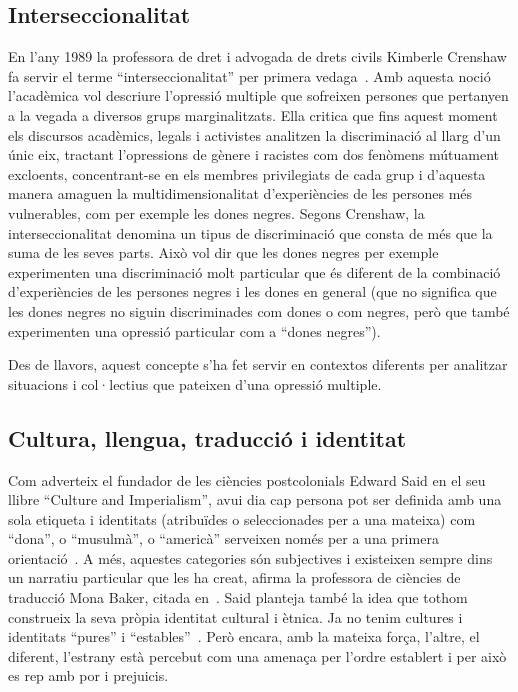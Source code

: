 \subsection{Interseccionalitat}
En l'any 1989 la professora de dret i advogada de drets civils Kimberle Crenshaw fa servir el terme ``interseccionalitat'' per primera vedaga~\autocite{Crenshaw1989}.
Amb aquesta noció l'acadèmica vol descriure l'opressió multiple que sofreixen persones que pertanyen a la vegada a diversos grups marginalitzats.
Ella critica que fins aquest moment els discursos acadèmics, legals i activistes analitzen la discriminació al llarg d'un únic eix,
tractant l'opressions de gènere i racistes com dos fenòmens mútuament excloents,
concentrant-se en els membres privilegiats de cada grup i d'aquesta manera amaguen la multidimensionalitat d'experiències de les persones més vulnerables, com per exemple les dones negres.
Segons Crenshaw, la interseccionalitat denomina un tipus de discriminació que consta de més que la suma de les seves parts.
Això vol dir que les dones negres per exemple experimenten una discriminació molt particular que és diferent de la combinació d'experiències de les persones negres i les dones en general (que no significa que les dones negres no siguin discriminades com dones o com negres, però que també experimenten una opressió particular com a ``dones negres'').

Des de llavors, aquest concepte s'ha fet servir en contextos diferents per analitzar situacions i col·lectius que pateixen d'una opressió multiple.

\subsection{Cultura, llengua, traducció i identitat}
Com adverteix el fundador de les ciències postcolonials Edward Said en el seu llibre ``Culture and Imperialism'', avui dia cap persona pot ser definida amb una sola etiqueta
i identitats (atribuïdes o seleccionades per a una mateixa) com ``dona'', o ``musulmà'', o ``americà'' serveixen només per a una primera orientació~\autocite{Vidal2012}.
A més, aquestes categories són subjectives i existeixen sempre dins un narratiu particular que les ha creat, afirma la professora de ciències de traducció Mona Baker, citada en~\autocite{Vidal2012}.
Said planteja també la idea que tothom construeix la seva pròpia identitat cultural i ètnica.
Ja no tenim cultures i identitats ``pures'' i ``estables''~\autocite{Vidal2012}.
Però encara, amb la mateixa força, l'altre, el diferent, l'estrany està percebut com una amenaça per l'ordre establert i per això es rep amb por i prejuicis.

